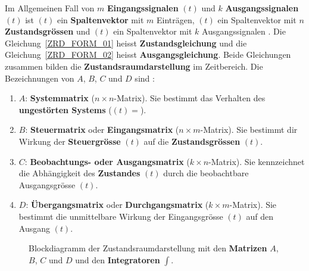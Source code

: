 \nit Im Allgemeinen Fall von $m$ {\bf Eingangssignalen} $(t)$ und
$k$ {\bf Ausgangssignalen} $(t)$ ist $(t)$ ein
{\bf Spaltenvektor} mit $m$ Eintr\"agen,
$(t)$ ein Spaltenvektor mit $n$ {\bf
  Zustandsgr\"ossen} und
$(t)$ ein Spaltenvektor mit $k$ Ausgangssignalen
\cite{GIR:RAB:STE:05}.
Die Gleichung~\ref{ZRD_FORM_01} heisst {\bf Zustandsgleichung} und die Gleichung~\ref{ZRD_FORM_02} heisst {\bf Ausgangsgleichung}. Beide Gleichungen zusammen bilden die {\bf Zustandsraumdarstellung} im Zeitbereich. Die Bezeichnungen von {\boldmath $A$, $B$, $C$} und  {\boldmath $D$} sind \cite{UNB:81, WOS:88}:\\
\begin{enumerate}
\item[] {\boldmath $A$}: {\bf Systemmatrix} ($n\times n$-Matrix). Sie bestimmt das Verhalten des {\bf ungest\"orten  Systems} ($(t)=$).
\item[] {\boldmath $B$}: {\bf Steuermatrix} oder
 {\bf Eingangsmatrix}
  ($n\times m$-Matrix). Sie bestimmt dir Wirkung der {\bf Steuergr\"osse} $(t)$ auf die {\bf Zustandsgr\"ossen} $(t)$.
\item[] {\boldmath $C$}: {\bf Beobachtungs- oder Ausgangsmatrix}
  ($k\times n$-Matrix). Sie kennzeichnet die Abh\"angigkeit des {\bf Zustandes} $(t)$ durch die beobachtbare Ausgangsgr\"osse $(t)$.
\item[] {\boldmath $D$}: {\bf \"Ubergangsmatrix} oder {\bf Durchgangsmatrix}
  ($k\times m$-Matrix). Sie bestimmt die unmittelbare Wirkung der Eingangsgr\"osse $(t)$ auf den Ausgang $(t)$.\\
\end{enumerate}
\begin{figure}[!htb]
\vspace*{-4mm}\begin{center}
  \vspace*{-3mm}\caption{Blockdiagramm der Zustandsraumdarstellung mit den {\bf Matrizen}  {\boldmath $A$, $B$, $C$} und  {\boldmath $D$} und den {\bf Integratoren} $\int$.}\label{ZVD_BILD_001}
\end{center}
\vspace*{-6mm}
\end{figure}

